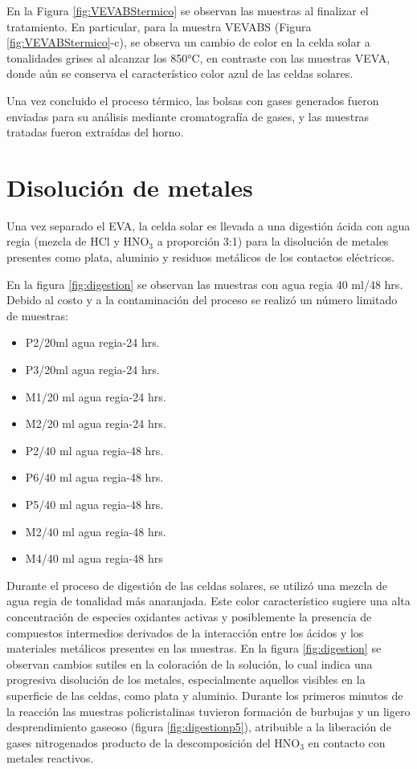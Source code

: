 En la Figura \ref{fig:VEVABStermico} se observan las muestras al finalizar el tratamiento. En particular, para la muestra VEVABS (Figura \ref{fig:VEVABStermico}-c), se observa un cambio de color en la celda solar a tonalidades grises al alcanzar los 850°C, en contraste con las muestras VEVA, donde aún se conserva el característico color azul de las celdas solares.

Una vez concluido el proceso térmico, las bolsas con gases generados fueron enviadas para su análisis mediante cromatografía de gases, y las muestras tratadas fueron extraídas del horno.

\section{Disolución de metales}    
\label{sec:separacióndemetales}		

Una vez separado el EVA, la celda solar es llevada a una digestión ácida con agua regia (mezcla de HCl y HNO$_{3}$ a proporción 3:1) para la disolución de metales presentes como plata, aluminio y residuos metálicos de los contactos eléctricos. 

En la figura \ref{fig:digestion} se observan las muestras con agua regia 40 ml/48 hrs. Debido al costo y a la contaminación del proceso se realizó un número limitado de muestras: 

\begin{itemize}
	\item P2/20ml agua regia-24 hrs. 
	\item P3/20ml agua regia-24 hrs. 
	\item M1/20 ml agua regia-24 hrs.
	\item M2/20 ml agua regia-24 hrs.
	\item P2/40 ml agua regia-48 hrs.
	\item P6/40 ml agua regia-48 hrs.
	\item P5/40 ml agua regia-48 hrs.
	\item M2/40 ml agua regia-48 hrs.
	\item M4/40 ml agua regia-48 hrs
\end{itemize}

Durante el proceso de digestión de las celdas solares, se utilizó una mezcla de agua regia de tonalidad más anaranjada. Este color característico sugiere una alta concentración de especies oxidantes activas y posiblemente la presencia de compuestos intermedios derivados de la interacción entre los ácidos y los materiales metálicos presentes en las muestras. En la figura \ref{fig:digestion} se observan cambios sutiles en la coloración de la solución, lo cual indica una progresiva disolución de los metales, especialmente aquellos visibles en la superficie de las celdas, como plata y aluminio. Durante los primeros minutos de la reacción las muestras policristalinas tuvieron formación de burbujas y un ligero desprendimiento gaseoso (figura \ref{fig:digestionp5}), atribuible a la liberación de gases nitrogenados producto de la descomposición del HNO$_{3}$ en contacto con metales reactivos.

